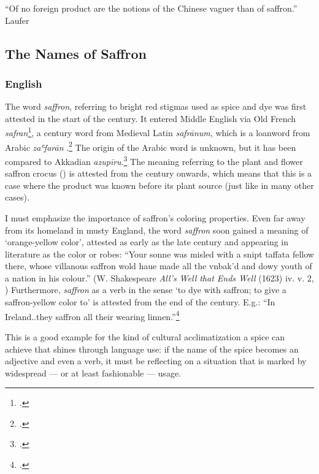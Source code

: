 ``Of no foreign product are the notions of the Chinese vaguer than
of saffron.'' Laufer

\subsection{The Names of Saffron}
\label{sec:names_of_saffron}

\subsubsection{English}



The word \textit{saffron}, referring to  bright red stigmas used as spice and dye was first attested in the start of the  century. It entered Middle English via Old French \textit{safran}\footcite[safran ]{tlfi}, a  century word from Medieval Latin \textit{safrānum}, which is a loanword from Arabic \textit{zaʿfarān} .\footcites[saffron]{oed}[saf(f)rǒun]{med} The origin of the Arabic word is unknown, but it has been compared to Akkadian \textit{azupīru}.\footcite[saffron ]{ahd} The meaning referring to the plant and flower saffron crocus () is attested from the  century onwards, which means that this is a case where the product was known before its plant source (just like in many other cases).

I must emphasize the importance of saffron's coloring properties. Even far away from its homeland in musty England, the word \textit{saffron} soon gained a meaning of `orange-yellow color', attested as early as the late  century and appearing in literature as the color or robes: ``Your sonne was misled with a snipt taffata fellow there, whose villanous saffron wold haue made all the vnbak'd and dowy youth of a nation in his colour.'' (W. Shakespeare \textit{All's Well that Ends Well} (1623) iv. v. 2, \cite[saffron]{oed}) Furthermore, \textit{saffron} as a verb in the sense `to dye with saffron; to give a saffron-yellow color to' is attested from the end of the  century. E.g.: ``In Ireland..they saffron all their wearing linnen.''\footcite[saffron, v.]{oed}

This is a good example for the kind of cultural acclimatization a spice can achieve that shines through language use: if the name of the spice becomes an adjective and even a verb, it must be reflecting on a situation that is marked by widespread --- or at least fashionable --- usage.

